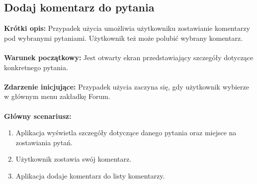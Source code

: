 \documentclass[10pt,a4paper]{report}
\begin{document}
\begin{adjustwidth}{2cm}{2cm}
\subsection{Dodaj komentarz do pytania}
\begin{minipage}{1\linewidth}
\textbf{Krótki opis:} Przypadek użycia umożliwia użytkowniku zostawianie komentarzy pod wybranymi pytaniami. Użytkownik też może polubić wybrany komentarz.\\ \\
\textbf{Warunek początkowy:} Jest otwarty ekran przedstawiający szczegóły dotyczące konkretnego pytania.\\ \\
\textbf{Zdarzenie inicjujące:} Przypadek użycia zaczyna się, gdy użytkownik wybierze w głównym menu zakładkę Forum. \\ \\
\textbf{Główny scenariusz:} 
\begin{enumerate}
\setlength\itemsep{0.2cm}
    \item Aplikacja wyświetla szczegóły dotyczące danego pytania oraz miejsce na zostawiania pytań. 
    \item Użytkownik zostawia swój komentarz.
    \item Aplikacja dodaje komentarz do listy komentarzy.
\end{enumerate}
\end{minipage}

\end{adjustwidth}
\end{document}
